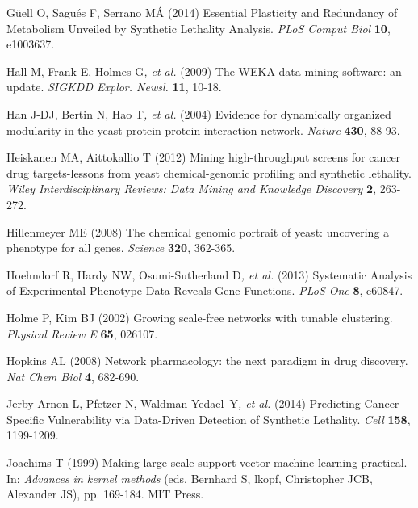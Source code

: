 \hypertarget{ENREF45}{}G\"uell O, Sagu\'es F, Serrano M\'A (2014)
Essential Plasticity and Redundancy of Metabolism Unveiled by Synthetic
Lethality Analysis. \textit{PLoS Comput Biol} \textbf{10}, e1003637.



\hypertarget{ENREF46}{}Hall M, Frank E, Holmes G\textit{, et al.} (2009)
The WEKA data mining software: an update. \textit{SIGKDD Explor.
Newsl.} \textbf{11}, 10-18.



\hypertarget{ENREF47}{}Han J-DJ, Bertin N, Hao T\textit{, et al.} (2004)
Evidence for dynamically organized modularity in the yeast
protein-protein interaction network. \textit{Nature} \textbf{430},
88-93.



\hypertarget{ENREF48}{}Heiskanen MA, Aittokallio T (2012) Mining
high-throughput screens for cancer drug targets-lessons from yeast
chemical-genomic profiling and synthetic lethality. \textit{Wiley
Interdisciplinary Reviews: Data Mining and Knowledge Discovery}
\textbf{2}, 263-272.



Hillenmeyer ME (2008) The chemical genomic portrait of yeast: uncovering
a phenotype for all genes. \textit{Science} \textbf{320}, 362-365.



\hypertarget{ENREF50}{}Hoehndorf R, Hardy NW, Osumi-Sutherland
D\textit{, et al.} (2013) Systematic Analysis of Experimental Phenotype
Data Reveals Gene Functions. \textit{PLoS One} \textbf{8}, e60847.



Holme P, Kim BJ (2002) Growing scale-free networks with tunable
clustering. \textit{Physical Review E} \textbf{65}, 026107.



\hypertarget{ENREF52}{}Hopkins AL (2008) Network pharmacology: the next
paradigm in drug discovery. \textit{Nat Chem Biol} \textbf{4}, 682-690.



\hypertarget{ENREF53}{}Jerby-Arnon L, Pfetzer N, Waldman
Yedael~Y\textit{, et al.} (2014) Predicting Cancer-Specific
Vulnerability via Data-Driven Detection of Synthetic Lethality.
\textit{Cell} \textbf{158}, 1199-1209.



\hypertarget{ENREF54}{}Joachims T (1999) Making large-scale support
vector machine learning practical. In: \textit{Advances in kernel
methods} (eds. Bernhard S, lkopf, Christopher JCB, Alexander JS), pp.
169-184. MIT Press.



